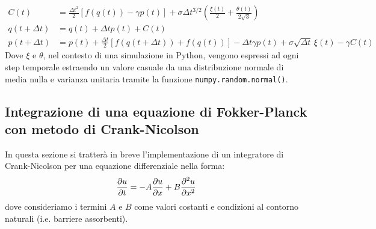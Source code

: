 \documentclass[10pt,a4paper]{article}
\begin{document}
\begin{align}
 	C(t) &= \frac{\Delta t^2}{2} [f(q(t)) - \gamma p(t)] + \sigma \Delta t^{3/2} \left(\frac{\xi(t)}{2} + \frac{\theta(t)}{2\sqrt{3}} \right) \\
 	q(t+\Delta t) &= q(t) + \Delta t p(t) + C(t) \\
 	p(t+\Delta t) &= p(t) + \frac{\Delta t}{2}[f(q(t+\Delta t)) + f(q(t))] - \Delta t \gamma p(t) + \sigma \sqrt{\Delta t}\,\xi(t) - \gamma C(t)
\end{align}
Dove \(\xi\) e \(\theta\), nel contesto di una simulazione in Python, vengono espressi ad ogni step temporale estraendo un valore casuale da una distribuzione normale di media nulla e varianza unitaria tramite la funzione \lstinline{numpy.random.normal()}.

\subsection{Integrazione di una equazione di Fokker-Planck con metodo di Crank-Nicolson}

In questa sezione si tratterà in breve l'implementazione di un integratore di Crank-Nicolson per una equazione differenziale nella forma:
\begin{equation}
	\pdv{u}{t} = - A \pdv{u}{x} + B \pdv[2]{u}{x}
\end{equation}
dove consideriamo i termini $A$ e $B$ come valori costanti e condizioni al contorno naturali (i.e. barriere assorbenti).
\end{document}
